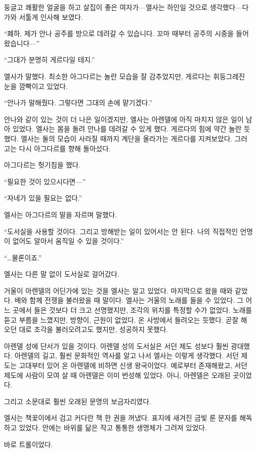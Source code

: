 둥글고 쾌활한 얼굴을 하고 살집이 좋은 여자가—엘사는 하인일 것으로 생각했다—다가와 서툴게 인사해 보였다.

``폐하, 제가 안나 공주를 방으로 데려갈 수 있습니다. 꼬마 때부터 공주의 시중을 들어왔습니다—''

``그대가 분명히 게르다일 테지.''

엘사가 말했다. 최소한 아그다르는 놀란 모습을 잘 감추었지만, 게르다는 휘둥그레진 눈을 깜빡이고 있었다.

``안나가 말해줬다. 그렇다면 그대의 손에 맡기겠다.''

안나와 같이 있는 것이 더 나은 일이겠지만, 엘사는 아렌델에 아직 마치지 않은 일이 남아 있었다. 엘사는 몸을 돌려 안나를 데려갈 수 있게 했다. 게르다의 힘에 약간 놀란 듯했다. 엘사는 둘의 모습이 사라질 때까지 계단을 올라가는 게르다를 지켜보았다. 그러고는 다시 아그다르를 향해 돌아섰다.

아그다르는 헛기침을 했다.

``필요한 것이 있으시다면—''

``자네가 있을 필요는 없다.''

엘사는 아그다르의 말을 자르며 말했다.

``도서실을 사용할 것이다. 그리고 방해받는 일이 있어서는 안 된다. 나의 직접적인 언명이 없어도 알아서 움직일 수 있을 것이다.''

``…물론이죠.''

엘사는 다른 말 없이 도서실로 걸어갔다.

거울이 아렌델의 어딘가에 있는 것을 엘사는 알고 있었다. 마지막으로 왔을 때와 같았다. 배와 함께 전쟁을 불러왔을 때 말이다. 엘사는 거울의 노래를 들을 수 있었다. 그 어느 곳에서 들은 것보다 더 크고 선명했지만, 조각의 위치를 특정할 수가 없었다. 노래를 듣고 부름을 느꼈지만, 방향이, 근원이 없었다. 온 사방에서 들려오는 듯했다. 곧잘 해 오던 대로 조각을 불러오려고도 했지만, 성공하지 못했다.

아렌델 성에 단서가 있을 것이다. 아렌델 성의 도서실은 서던 제도 성보다 훨씬 광대했다. 아렌델의 길고, 훨씬 문화적인 역사를 알고 나서 엘사는 이렇게 생각했다. 서던 제도는 고대부터 있어 온 아렌델에 비하면 신생 왕국이었다. 예로부터 존재해왔고, 서던 제도에 사람이 모여 살 때 아렌델은 이미 번성해 있었다. 아니, 아렌델은 오래된 곳이었다.

그리고 소문대로 훨씬 오래된 문명의 보금자리였다.

엘사는 책꽂이에서 검고 커다란 책 한 권을 꺼냈다. 표지에 새겨진 금빛 룬 문자를 해독하고 있었다. 안에는 바위를 닮은 작고 통통한 생명체가 그려져 있었다.

바로 트롤이었다.

